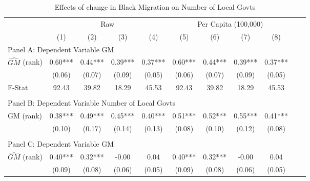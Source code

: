  \begin{table}[htbp]\centering {} \begin{threeparttable} \caption{Effects of change in Black Migration on Number of Local Govts} \begin{tabular}{l*{10}{c}} \toprule
                &\multicolumn{4}{c}{Raw}                                    &\multicolumn{4}{c}{Per Capita (100,000)}                   \\\cmidrule(lr){2-5}\cmidrule(lr){6-9}
                &\multicolumn{1}{c}{(1)}   &\multicolumn{1}{c}{(2)}   &\multicolumn{1}{c}{(3)}   &\multicolumn{1}{c}{(4)}   &\multicolumn{1}{c}{(5)}   &\multicolumn{1}{c}{(6)}   &\multicolumn{1}{c}{(7)}   &\multicolumn{1}{c}{(8)}   \\
\cmidrule(lr){1-9}
\multicolumn{8}{l}{Panel A: Dependent Variable GM}\\
\cmidrule(lr){1-9}
$\hat{GM}$ (rank)&       0.60***&       0.44***&       0.39***&       0.37***&       0.60***&       0.44***&       0.39***&       0.37***\\
                &     (0.06)   &     (0.07)   &     (0.09)   &     (0.05)   &     (0.06)   &     (0.07)   &     (0.09)   &     (0.05)   \\
\midrule
F-Stat          &      92.43   &      39.82   &      18.29   &      45.53   &      92.43   &      39.82   &      18.29   &      45.53   \\
\cmidrule[\heavyrulewidth](lr){1-9} \\ \cmidrule[\heavyrulewidth](lr){1-9}
\multicolumn{8}{l}{Panel B: Dependent Variable Number of Local Govts}\\
\cmidrule(lr){1-9}
GM  (rank)      &       0.38***&       0.49***&       0.45***&       0.40***&       0.51***&       0.52***&       0.55***&       0.41***\\
                &     (0.10)   &     (0.17)   &     (0.14)   &     (0.13)   &     (0.08)   &     (0.10)   &     (0.12)   &     (0.08)   \\
\cmidrule[\heavyrulewidth](lr){1-9} \\ \cmidrule[\heavyrulewidth](lr){1-9}
\multicolumn{8}{l}{Panel C: Dependent Variable GM}\\
\cmidrule(lr){1-9}
$\hat{GM}$ (rank)&       0.40***&       0.32***&      -0.00   &       0.04   &       0.40***&       0.32***&      -0.00   &       0.04   \\
                &     (0.09)   &     (0.08)   &     (0.06)   &     (0.05)   &     (0.09)   &     (0.08)   &     (0.06)   &     (0.05)   \\

\end{tabular}
\end{threeparttable}
\end{table}
